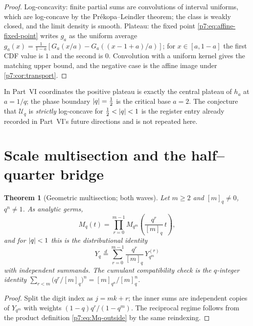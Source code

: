 \documentclass[11pt,oneside]{article}
\numberwithin{equation}{section}
\newtheorem{theorem}{Theorem}[section]
\theoremstyle{definition}
\theoremstyle{remark}
\begin{document}
\begin{proof}
Log-concavity: finite partial sums are convolutions of interval uniforms,
which are log-concave by the Pr\'ekopa--Leindler theorem; the class is
weakly closed, and the limit density is smooth.  Plateau: the fixed point \eqref{p7:eq:affine-fixed-point}
writes $g_a$ as the uniform average
$g_a(x)=\tfrac1{1-a}[G_a(x/a)-G_a((x-1+a)/a)]$; for $x\in[a,1-a]$ the first
CDF value is $1$ and the second is $0$.  Convolution with a uniform kernel
gives the matching upper bound, and the negative case is the affine image
under \cref{p7:cor:transport}.
\end{proof}

In Part~VI coordinates the positive plateau is exactly the central plateau of
$h_a$ at $a=1/q$; the phase boundary $\left\lvert q\right\rvert=\tfrac12$ is the critical base
$a=2$.  The conjecture that $\mathcal U_q$ is \emph{strictly} log-concave for
$\tfrac12<\left\lvert q\right\rvert<1$ is the register entry already recorded in Part~VI's
future directions and is not repeated here.

\section{Scale multisection and the half--quarter bridge}
\label{p7:sec:multisection}

\begin{theorem}[Geometric multisection; both waves]
\label{p7:thm:multisection}
Let $m\ge2$ and $[m]_q\ne0$, $q^n\ne1$.  As analytic germs,
\begin{equation}\label{p7:eq:M-multisection}
 \boxed{\ M_q(t)=\prod_{r=0}^{m-1}
 M_{q^m}\!\left(\frac{q^r}{[m]_q}\,t\right),\ }
\end{equation}
and for $\left\lvert q\right\rvert<1$ this is the distributional identity
\begin{equation}\label{p7:eq:Y-multisection}
 Y_q\overset d=\sum_{r=0}^{m-1}\frac{q^r}{[m]_q}\,Y_{q^m}^{(r)}
\end{equation}
with independent summands.  The cumulant compatibility check is the
$q$-integer identity
$\sum_{r<m}\bigl(q^r/[m]_q\bigr)^n=[m]_{q^n}/[m]_q^n$.
\end{theorem}

\begin{proof}
Split the digit index as $j=mk+r$; the inner sums are independent copies of
$Y_{q^m}$ with weights $(1-q)q^r/(1-q^m)$.  The reciprocal regime follows from
the product definition \eqref{p7:eq:Mq-outside} by the same reindexing.
\end{proof}
\end{document}
